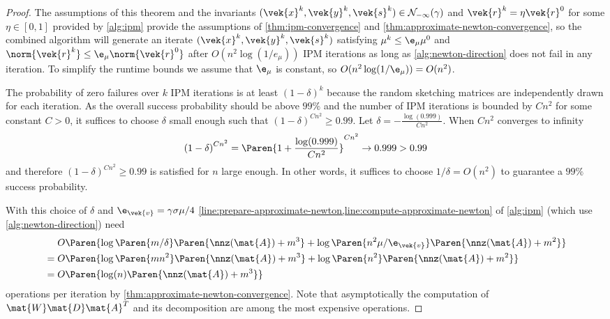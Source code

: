 \begin{proof}
  The assumptions of this theorem and the invariants \((\vek{x}^k, \vek{y}^k, \vek{s}^k) \in \mathcal{N}_{-\infty}(\gamma)\) and \(\vek{r}^k = \eta \vek{r}^0\) for some \(\eta \in [0, 1]\) provided by \cref{alg:ipm} provide the assumptions of \cref{thm:ipm-convergence} and \cref{thm:approximate-newton-convergence}, so the combined algorithm will generate an iterate \((\vek{x}^k, \vek{y}^k, \vek{s}^k)\) satisfying \(\mu^k \leq \e_\mu \mu^0\) and \(\norm{\vek{r}^k} \leq \e_\mu \norm{\vek{r}^0}\) after \(O(n^2 \log(1/e_\mu))\) IPM iterations as long as \cref{alg:newton-direction} does not fail in any iteration.
  To simplify the runtime bounds we assume that \(\e_\mu\) is constant, so \(O(n^2 \log(1/\e_\mu)) = O(n^2)\).

  The probability of zero failures over \(k\) IPM iterations is at least \({(1 - \delta)}^k\) because the random sketching matrices are independently drawn for each iteration.
  As the overall success probability should be above \(99\%\) and the number of IPM iterations is bounded by \(C n^2\) for some constant \(C > 0\), it suffices to choose \(\delta\) small enough such that
  \( {(1 - \delta)}^{C n^2} \geq 0.99 \).
  Let \(\delta = -\frac{\log(0.999)}{C n^2}\). When \(C n^2\) converges to infinity
  \[ {(1 - \delta)}^{C n^2} = \Paren{1 + \frac{\log(0.999)}{C n^2}}^{C n^2} \to 0.999 > 0.99 \]
  and therefore \( {(1 - \delta)}^{C n^2} \geq 0.99 \) is satisfied for \(n\) large enough.
  In other words, it suffices to choose \(1/\delta = O(n^2)\) to guarantee a \(99\%\) success probability.

  With this choice of \(\delta\) and \(\e_{\vek{v}} = \gamma \sigma \mu / 4\) \cref{line:prepare-approximate-newton,line:compute-approximate-newton} of \cref{alg:ipm} (which use \cref{alg:newton-direction}) need
  \begin{align*}
    &\phantom{{}={}} O \Paren{\log \Paren{m/\delta} \Paren{\nnz(\mat{A}) + m^3} + \log \Paren{n^2 \mu / \e_{\vek{v}}} \Paren{\nnz(\mat{A}) + m^2}} \\
    &= O \Paren{\log \Paren{mn^2} \Paren{\nnz(\mat{A}) + m^3} + \log \Paren{n^2} \Paren{\nnz(\mat{A}) + m^2}} \\
    &= O \Paren{\log(n) \Paren{\nnz(\mat{A}) + m^3}}
  \end{align*}
  operations per iteration by \cref{thm:approximate-newton-convergence}.
  Note that asymptotically the computation of \(\mat{W}\mat{D}\mat{A}^T\) and its decomposition are among the most expensive operations.


\end{proof}

